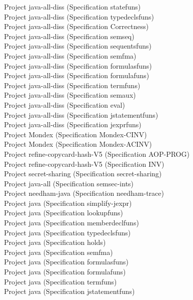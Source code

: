 \documentclass[a4paper]{article}
\begin{document}
\begin{itemize}
Project java-all-diss (Specification statefuns) \\
Project java-all-diss (Specification typedeclsfuns) \\
Project java-all-diss (Specification Correctness) \\
Project java-all-diss (Specification semseq) \\
Project java-all-diss (Specification sequentsfuns) \\
Project java-all-diss (Specification semfma) \\
Project java-all-diss (Specification formulasfuns) \\
Project java-all-diss (Specification formulafuns) \\
Project java-all-diss (Specification termfuns) \\
Project java-all-diss (Specification semaux) \\
Project java-all-diss (Specification eval) \\
Project java-all-diss (Specification jstatementfuns) \\
Project java-all-diss (Specification jexprfuns) \\
Project Mondex (Specification Mondex-CINV) \\
Project Mondex (Specification Mondex-ACINV) \\
Project refine-copycard-hash-V5 (Specification AOP-PROG) \\
Project refine-copycard-hash-V5 (Specification INV) \\
Project secret-sharing (Specification secret-sharing) \\
Project java-all (Specification semsec-ints) \\
Project needham-java (Specification needham-trace) \\
Project java (Specification simplify-jexpr) \\
Project java (Specification lookupfuns) \\
Project java (Specification memberdeclfuns) \\
Project java (Specification typedeclsfuns) \\
Project java (Specification holds) \\
Project java (Specification semfma) \\
Project java (Specification formulasfuns) \\
Project java (Specification formulafuns) \\
Project java (Specification termfuns) \\
Project java (Specification jstatementfuns) \\

\end{itemize}
\end{document}
